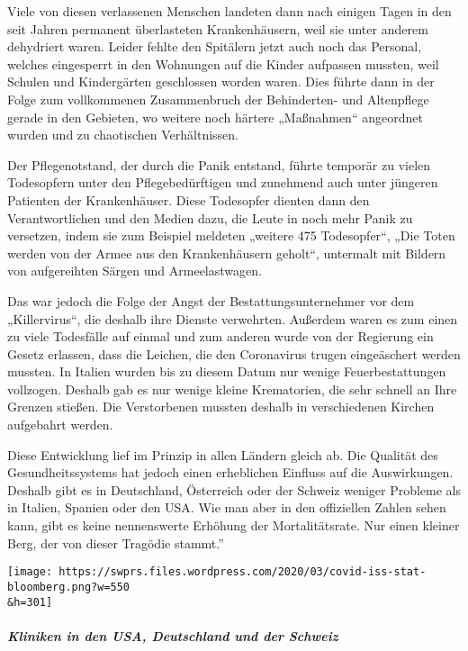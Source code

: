 Viele von diesen verlassenen Menschen landeten dann nach einigen Tagen
in den seit Jahren permanent überlasteten Krankenhäusern, weil sie unter
anderem dehydriert waren. Leider fehlte den Spitälern jetzt auch noch
das Personal, welches eingesperrt in den Wohnungen auf die Kinder
aufpassen mussten, weil Schulen und Kindergärten geschlossen worden
waren. Dies führte dann in der Folge zum vollkommenen Zusammenbruch der
Behinderten- und Altenpflege gerade in den Gebieten, wo weitere noch
härtere „Maßnahmen`` angeordnet wurden und zu chaotischen Verhältnissen.

Der Pflegenotstand, der durch die Panik entstand, führte temporär zu
vielen Todesopfern unter den Pflegebedürftigen und zunehmend auch unter
jüngeren Patienten der Krankenhäuser. Diese Todesopfer dienten dann den
Verantwortlichen und den Medien dazu, die Leute in noch mehr Panik zu
versetzen, indem sie zum Beispiel meldeten „weitere 475 Todesopfer``,
„Die Toten werden von der Armee aus den Krankenhäusern geholt``,
untermalt mit Bildern von aufgereihten Särgen und Armeelastwagen.

Das war jedoch die Folge der Angst der Bestattungsunternehmer vor dem
„Killervirus``, die deshalb ihre Dienste verwehrten. Außerdem waren es
zum einen zu viele Todesfälle auf einmal und zum anderen wurde von der
Regierung ein Gesetz erlassen, dass die Leichen, die den Coronavirus
trugen eingeäschert werden mussten. In Italien wurden bis zu diesem
Datum nur wenige Feuerbestattungen vollzogen. Deshalb gab es nur wenige
kleine Krematorien, die sehr schnell an Ihre Grenzen stießen. Die
Verstorbenen mussten deshalb in verschiedenen Kirchen aufgebahrt werden.

Diese Entwicklung lief im Prinzip in allen Ländern gleich ab. Die
Qualität des Gesund­heits­systems hat jedoch einen erheblichen Einfluss
auf die Auswirkungen. Deshalb gibt es in Deutschland, Österreich oder
der Schweiz weniger Probleme als in Italien, Spanien oder den USA. Wie
man aber in den offiziellen Zahlen sehen kann, gibt es keine
nennenswerte Erhöhung der Mortalitätsrate. Nur einen kleiner Berg, der
von dieser Tragödie stammt.''

\texttt{[image: https://swprs.files.wordpress.com/2020/03/covid-iss-stat-bloomberg.png?w=550\\\&h=301]}

\hypertarget{kliniken-in-den-usa-deutschland-und-der-schweiz}{%
\subparagraph{\texorpdfstring{\textbf{Kliniken in den USA, Deutschland
und der
Schweiz}}{Kliniken in den USA, Deutschland und der Schweiz}}\label{kliniken-in-den-usa-deutschland-und-der-schweiz}}

